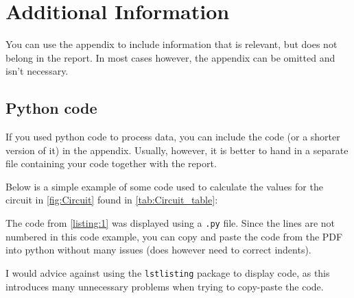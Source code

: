 \appendix


\section{Additional Information}

You can use the appendix to include information that is relevant, but does not belong in the report. In most cases however, the appendix can be omitted and isn't necessary. \par
\subsection{Python code}
If you used python code to process data, you can include the code (or a shorter version of it) in the appendix. Usually, however, it is better to hand in a separate file containing your code together with the report.
 \par

Below is a simple example of some code used to calculate the values for the circuit in \vref{fig:Circuit} 
found in \cref{tab:Circuit_table}:


The code from \cref{listing:1} was displayed using a \verb+.py+ file. Since the lines are not numbered in this code example, you can copy and paste the code from the PDF into python without many issues (does however need to correct indents). \par
I would advice against using the \verb+lstlisting+ package to display code, as this introduces many unnecessary problems when trying to copy-paste the code.\par

